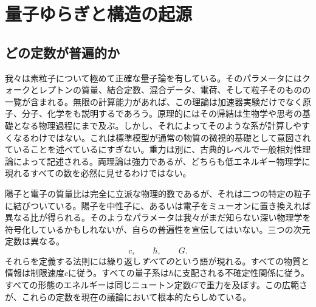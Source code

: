 \chapter{量子ゆらぎと構造の起源}


\section{どの定数が普遍的か}

我々は素粒子について極めて正確な量子論を有している。そのパラメータにはクォークとレプトンの質量、結合定数、混合データ、電荷、そして粒子そのものの一覧が含まれる。無限の計算能力があれば、この理論は加速器実験だけでなく原子、分子、化学をも説明するであろう。原理的にはその帰結は生物学や思考の基礎となる物理過程にまで及ぶ。しかし、それによってそのような系が計算しやすくなるわけではない。これは標準模型が通常の物質の微視的基礎として意図されていることを述べているにすぎない。重力は別に、古典的レベルで一般相対性理論によって記述される。両理論は強力であるが、どちらも低エネルギー物理学に現れるすべての数を必然に見せるわけではない。

陽子と電子の質量比は完全に立派な物理的数であるが、それは二つの特定の粒子に結びついている。陽子を中性子に、あるいは電子をミューオンに置き換えれば異なる比が得られる。そのようなパラメータは我々がまだ知らない深い物理学を符号化しているかもしれないが、自らの普遍性を宣伝してはいない。三つの次元定数は異なる。
\[
c,\qquad \hbar,\qquad G.
\]
それらを定義する法則には繰り返し\emph{すべての}という語が現れる。すべての物質と情報は制限速度\(c\)に従う。すべての量子系は\(\hbar\)に支配される不確定性関係に従う。すべての形態のエネルギーは同じニュートン定数\(G\)で重力を及ぼす。この広範さが、これらの定数を現在の議論において根本的たらしめている。

